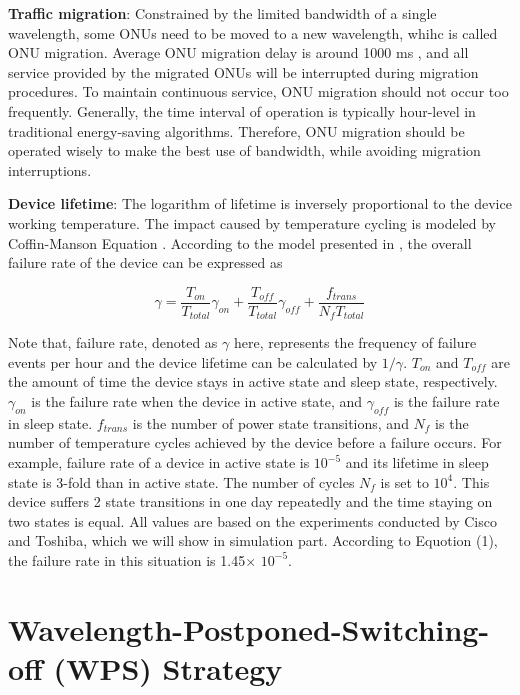 \documentclass[letter]{IEEEtran}
\begin{document}
\textbf{Traffic migration}: Constrained by the limited bandwidth of a single wavelength, some ONUs need to be moved to a new wavelength, whihc is called ONU migration. Average ONU migration delay is around 1000 ms \cite{Li:14}, and all service provided by the migrated ONUs will be interrupted during migration procedures. To maintain continuous service, ONU migration should not occur too frequently. Generally, the time interval of operation is typically hour-level in traditional energy-saving algorithms. Therefore, ONU migration should be operated wisely to make the best use of bandwidth, while avoiding migration interruptions.

\textbf{Device lifetime}: The logarithm of lifetime is inversely proportional to the device working temperature. The impact caused by temperature cycling is modeled by Coffin-Manson Equation \cite{manson1954behavior}. According to the model presented in \cite{7105670}, the overall failure rate of the device can be expressed as \\
\begin{footnotesize}
\begin{equation}
\gamma = \frac{T_{on}}{T_{total}}\gamma_{on} + \frac{T_{off}}{T_{total}}\gamma_{off} + \frac{f_{trans}}{N_{f}T_{total}}
\end{equation}
\end{footnotesize}
Note that, failure rate, denoted as $ \gamma $ here, represents the frequency of failure events per hour and the device lifetime can be calculated by $1 /\gamma$. $T_{on}$ and $T_{off}$ are the amount of time the device stays in active state and sleep state, respectively. $\gamma_{on}$ is the failure rate when the device in active state, and $\gamma_{off}$ is the failure rate in sleep state. $f_{trans}$ is the number of power state transitions, and $N_{f}$ is the number of temperature cycles achieved by the device before a failure occurs. For example, failure rate of a device in active state is $ 10^{-5}$ and its lifetime in sleep state is 3-fold than in active state. The number of cycles $ N_{f} $ is set to $ 10^{4}$. This device suffers 2 state transitions in one day repeatedly and the time staying on two states is equal. All values are based on the experiments conducted by Cisco and Toshiba, which we will show in simulation part. According to Equotion (1), the failure rate in this situation is 1.45$ \times $ $ 10^{-5}$.
\vspace{-3.0mm}

\section{Wavelength-Postponed-Switching-off (WPS) Strategy}
\end{document}
